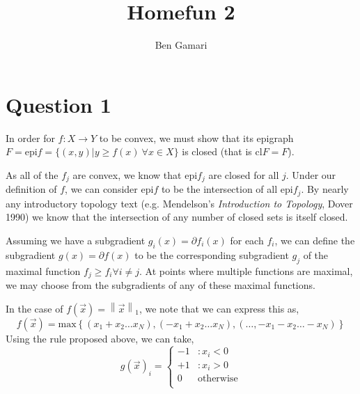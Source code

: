 \documentclass{article}
\title{Homefun 2}
\author{Ben Gamari}
\begin{document}
\maketitle

\newcommand{\norm}[1]{\ensuremath{\left\lVert #1 \right\rVert}}
\newcommand{\twonorm}[1]{\ensuremath{\norm{#1}_2^2}}
\newcommand{\epi}{\ensuremath{\mathrm{epi}}}

\section{Question 1}

In order for $f : X \rightarrow Y$ to be convex, we must show that its
epigraph $F = \epi f = \{ (x,y) \vert y \ge f(x)~\forall x \in X \}$
is closed (that is $\mathrm{cl} F = F$).

As all of the $f_j$ are convex, we know that $\epi f_j$ are
closed for all $j$. Under our definition of $f$, we can consider $\epi
f$ to be the intersection of all $\epi f_j$. By nearly any
introductory topology text (e.g. Mendelson's {\it Introduction to
Topology}, Dover 1990) we know that the intersection of any number of
closed sets is itself closed.

Assuming we have a subgradient $g_i(x) = \partial f_i(x)$ for each
$f_i$, we can define the subgradient $g(x) = \partial f(x)$ to be
the corresponding subgradient $g_j$ of the maximal function $f_j \ge
f_i \forall i \ne j$. At points where multiple functions are maximal,
we may choose from the subgradients of any of these maximal functions.

In the case of $f(\vec x) = \norm{\vec x}_1$, we note that we can express this as,
\[ f(\vec x) = \mathrm{max} \left\{ (x_1+x_2 \ldots x_N), (-x_1+x_2 \ldots x_N), (\ldots, -x_1-x_2 \ldots -x_N) \right\} \]
Using the rule proposed above, we can take,
\[ g(\vec x)_i = \left\{ \begin{array}{lr}
                     -1   & : x_i < 0 \\
                     +1   & : x_i > 0 \\
                     0    & \mathrm{otherwise} \\
                     \end{array}
                 \right. \]
\end{document}

